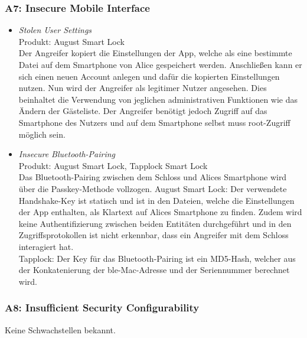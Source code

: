     \subsubsection*{A7: Insecure Mobile Interface}
        \begin{itemize}[leftmargin=0cm,label={}]
            \item \emph{Stolen User Settings}\cite{Ye2017}\label{vuln:usersettings}\\
                Produkt: August Smart Lock\\ 
                Der Angreifer kopiert die Einstellungen der App, welche als eine bestimmte Datei auf dem Smartphone von Alice gespeichert werden.
    		    Anschließen kann er sich einen neuen Account anlegen und dafür die kopierten Einstellungen nutzen.
    		    Nun wird der Angreifer als legitimer Nutzer angesehen.
    		    Dies beinhaltet die Verwendung von jeglichen administrativen Funktionen wie das Ändern der Gästeliste.
    		    Der Angreifer benötigt jedoch Zugriff auf das Smartphone des Nutzers und auf dem Smartphone selbst muss root-Zugriff möglich sein.
		    \item \emph{Insecure Bluetooth-Pairing}\cite{Tierney2018,Rose2016,Ye2017,Fuller2017}\label{vuln:blepairing}\\
                Produkt: August Smart Lock, Tapplock Smart Lock\\
                Das Bluetooth-Pairing zwischen dem Schloss und Alices Smartphone wird über die Passkey-Methode vollzogen. 
                August Smart Lock: Der verwendete Handshake-Key ist statisch und ist in den Dateien, welche die Einstellungen der App enthalten, als Klartext auf Alices Smartphone zu finden. 
                Zudem wird keine Authentifizierung zwischen beiden Entitäten durchgeführt und in den Zugriffsprotokollen ist nicht erkennbar, dass ein Angreifer mit dem Schloss interagiert hat.\\
                Tapplock: Der Key für das Bluetooth-Pairing ist ein MD5-Hash, welcher aus der Konkatenierung der \gls{ble}-Mac-Adresse und der Seriennummer berechnet wird.
        \end{itemize}
        
    \subsubsection*{A8: Insufficient Security Configurability}
        Keine Schwachstellen bekannt.
        
